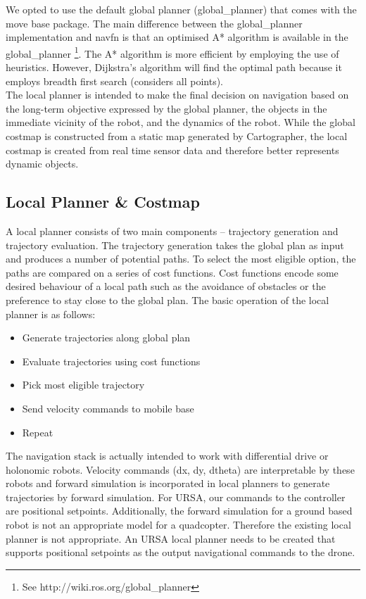 \documentclass[capstone_report.tex]{subfiles}
\begin{document}
We opted to use the default global planner (global\_planner) that comes with the move base package.  The main difference between the global\_planner implementation and navfn is that an optimised A* algorithm is available in the global\_planner \footnote{See http://wiki.ros.org/global\_planner}.  The A* algorithm is more efficient by employing the use of heuristics.  However, Dijkstra’s algorithm will find the optimal path because it employs breadth first search (considers all points).\\

The local planner is intended to make the final decision on navigation based on the long-term objective expressed by the global planner, the objects in the immediate vicinity of the robot, and the dynamics of the robot. While the global costmap is constructed from a static map generated by Cartographer, the local costmap is created from real time sensor data and therefore better represents dynamic objects.\\

\subsection{Local Planner \& Costmap}

A local planner consists of two main components – trajectory generation and trajectory evaluation.  The trajectory generation takes the global plan as input and produces a number of potential paths.  To select the most eligible option, the paths are compared on a series of cost functions.   Cost functions encode some desired behaviour of a local path such as the avoidance of obstacles or the preference to stay close to the global plan.  The basic operation of the local planner is as follows:

\begin{itemize}
    \item Generate trajectories along global plan
    \item Evaluate trajectories using cost functions
    \item Pick most eligible trajectory
    \item Send velocity commands to mobile base
    \item Repeat
\end{itemize}

The navigation stack is actually intended to work with differential drive or holonomic robots.  Velocity commands (dx, dy, dtheta) are interpretable by these robots and forward simulation is incorporated in local planners to generate trajectories by forward simulation. For URSA, our commands to the controller are positional setpoints. Additionally, the forward simulation for a ground based robot is not an appropriate model for a quadcopter. Therefore the existing local planner is not appropriate. An URSA local planner needs to be created that supports positional setpoints as the output navigational commands to the drone.\\
\end{document}
